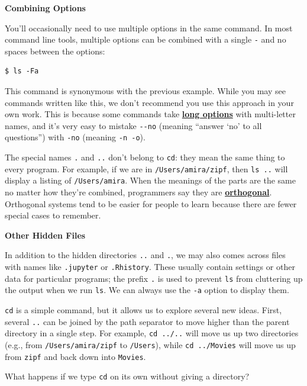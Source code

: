 \documentclass[
]{krantz}
\renewenvironment{quote}{\begin{VF}}{\end{VF}}
\newcommand{\gref}[2]{\hyperlink{#2}{\textbf{#1}}}
\begin{document}
\begin{quote}
\textbf{Combining Options}

You'll occasionally need to use multiple options in the same command.
In most command line tools,
multiple options can be combined with a single \texttt{-}
and no spaces between the options:

\begin{verbatim}
$ ls -Fa
\end{verbatim}

This command is synonymous with the previous example.
While you may see commands written like this,
we don't recommend you use this approach in your own work.
This is because some commands take \gref{long options}{long\_option}
with multi-letter names,
and it's very easy to mistake \texttt{-\/-no} (meaning ``answer `no' to all questions'')
with \texttt{-no} (meaning \texttt{-n\ -o}).
\end{quote}

The special names \texttt{.} and \texttt{..} don't belong to \texttt{cd}:
they mean the same thing to every program.
For example,
if we are in \texttt{/Users/amira/zipf},
then \texttt{ls~..} will display a listing of \texttt{/Users/amira}.
When the meanings of the parts are the same no matter how they're combined,
programmers say they are \gref{orthogonal}{orthogonality}.
Orthogonal systems tend to be easier for people to learn
because there are fewer special cases to remember.

\begin{quote}
\textbf{Other Hidden Files}

In addition to the hidden directories \texttt{..} and \texttt{.},
we may also comes across files with names like \texttt{.jupyter} or \texttt{.Rhistory}.
These usually contain settings or other data for particular programs;
the prefix \texttt{.} is used to prevent \texttt{ls} from cluttering up the output
when we run \texttt{ls}.
We can always use the \texttt{-a} option to display them.
\end{quote}

\texttt{cd} is a simple command,
but it allows us to explore several new ideas.
First,
several \texttt{..} can be joined by the path separator
to move higher than the parent directory in a single step.
For example, \texttt{cd~../..} will move us up two directories
(e.g., from \texttt{/Users/amira/zipf} to \texttt{/Users}),
while \texttt{cd~../Movies} will move us up from \texttt{zipf} and back down into \texttt{Movies}.

What happens if we type \texttt{cd} on its own without giving a directory?
\end{document}
